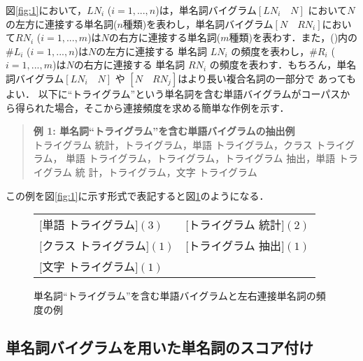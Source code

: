 図\ref{fig:1}において，$LN_i$ ($i=1,...,n$)は，単名詞バイグラム$[LN_i
\hspace{1em} N]$ において$N$の左方に連接する単名詞($n$種類)を表わし，単名詞バイグラム$[N \hspace{1em} RN_i]$において$RN_i$ ($i=1,...,m$)は$N$の右方に連接する単名詞($m$種類)を表わす．また，()内の$\#L_i$ ($i=1,...,n$)は$N$の左方に連接する
単名詞 $LN_i$ の頻度を表わし，$\#R_i$ ($i=1,...,m$)は$N$の右方に連接する
単名詞 $RN_i$ の頻度を表わす．もちろん，単名詞バイグラム$[LN_i
\hspace{1em} N]$ や $[N \hspace{1em} RN_j]$はより長い複合名詞の一部分で
あってもよい．
以下に``トライグラム''という単名詞を含む単語バイグラムがコーパスから得られた場合，そこから連接頻度を求める簡単な作例を示す．
\begin{quote}
{\bf 例 1: 単名詞``トライグラム''を含む単語バイグラムの抽出例}\\
トライグラム 統計，トライグラム，単語 トライグラム，クラス トライグラム，
 単語 トライグラム，トライグラム，トライグラム 抽出，単語 トライグラム 統
 計，トライグラム，文字 トライグラム
\end{quote}
この例を図\ref{fig:1}に示す形式で表記すると図\ref{fig:2}のようになる．

\begin{figure}[htbp]
\hspace*{\fill}
\begin{tabular}{ll}
$[$単語 トライグラム$](3)$  &    $[$トライグラム 統計$](2)$\\
$[$クラス トライグラム$](1)$ & $[$トライグラム 抽出$](1)$ \\
$[$文字 トライグラム$](1)$               &      \\
\end{tabular}
\hspace*{\fill}
\caption{単名詞``トライグラム''を含む単語バイグラムと左右連接単名詞の頻度の例}
\label{fig:2}
\end{figure}




\subsection{単名詞バイグラムを用いた単名詞のスコア付け}

